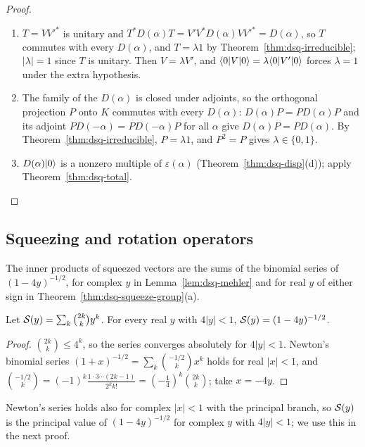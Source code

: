 \begin{veteenv}
\begin{proof}
\begin{enumerate}
\item[(a)] $T=VV'^*$ is unitary and $T^*D(\alpha)T=V'V^*D(\alpha)VV'^*=D(\alpha)$, so $T$ commutes with every $D(\alpha)$, and
$T=\lambda1$ by Theorem~\ref{thm:dsq-irreducible}; $\lvert\lambda\rvert=1$ since $T$ is unitary. Then $V=\lambda V'$, and
$\langle0\rvert V\lvert 0\rangle=\lambda\langle0\rvert V'\lvert 0\rangle$ forces $\lambda=1$ under the extra hypothesis.
\item[(b)] The family of the $D(\alpha)$ is closed under adjoints, so the orthogonal projection $P$ onto $K$ commutes with
every $D(\alpha)$: $D(\alpha)P=PD(\alpha)P$ and its adjoint $PD(-\alpha)=PD(-\alpha)P$ for all $\alpha$ give $D(\alpha)P=PD(\alpha)$.
By Theorem~\ref{thm:dsq-irreducible}, $P=\lambda1$, and $P^2=P$ gives $\lambda\in\{0,1\}$.
\item[(c)] $D(\alpha)\lvert 0\rangle$ is a nonzero multiple of $\varepsilon(\alpha)$ (Theorem~\ref{thm:dsq-disp}(d)); apply
Theorem~\ref{thm:dsq-total}.\qedhere
\end{enumerate}
\end{proof}

\subsection{Squeezing and rotation operators}\label{sec:dsq-squeeze}

The inner products of squeezed vectors are the sums of the binomial series of $(1-4y)^{-1/2}$, for complex $y$ in
Lemma~\ref{lem:dsq-mehler} and for real $y$ of either sign in Theorem~\ref{thm:dsq-squeeze-group}(a).

\begin{lemma}\label{lem:dsq-binomial}
Let $\mathcal S(y)=\sum_k\binom{2k}ky^k$. For every real $y$ with $4\lvert y\rvert<1$, $\mathcal S(y)=(1-4y)^{-1/2}$.
\end{lemma}

\begin{proof}
$\binom{2k}k\le4^k$, so the series converges absolutely for $4\lvert y\rvert<1$. Newton's binomial series
$(1+x)^{-1/2}=\sum_k\binom{-1/2}kx^k$ holds for real $\lvert x\rvert<1$, and
$\binom{-1/2}k=(-1)^k\frac{1\cdot3\cdots(2k-1)}{2^kk!}=(-\tfrac14)^k\binom{2k}k$; take $x=-4y$.
\end{proof}

Newton's series holds also for complex $\lvert x\rvert<1$ with the principal branch, so $\mathcal S(y)$ is the principal value of
$(1-4y)^{-1/2}$ for complex $y$ with $4\lvert y\rvert<1$; we use this in the next proof.


\end{veteenv}
